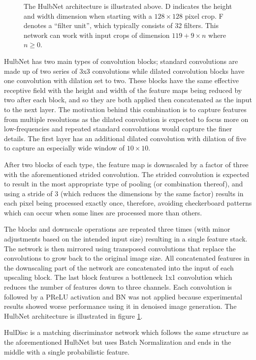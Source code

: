 
\begin{figure}
  \begin{center}
    \scalebox{0.5}{}
    \caption[HulbNet architecture]{The HulbNet architecture is illustrated above. D indicates the height and width dimension when starting with a $128\times 128$ pixel crop. F denotes a ``filter unit'', which typically consists of 32 filters. This network can work with input crops of dimension $119+9\times n$ where $n \ge 0$.}
    \label{fig:Hulb128Net}
  \end{center}
\end{figure}

HulbNet has two main types of convolution blocks; standard convolutions are made up of two series of 3x3 convolutions while dilated convolution blocks have one convolution with dilation set to two. These blocks have the same effective receptive field with the height and width of the feature maps being reduced by two after each block, and so they are both applied then concatenated as the input to the next layer. The motivation behind this combination is to capture features from multiple resolutions as the dilated convolution is expected to focus more on low-frequencies and repeated standard convolutions would capture the finer details. The first layer has an additional dilated convolution with dilation of five to capture an especially wide window of $10\times 10$.

After two blocks of each type, the feature map is downscaled by a factor of three with the aforementioned strided convolution. The strided convolution is expected to result in the most appropriate type of pooling (or combination thereof), and using a stride of 3 (which reduces the dimensions by the same factor) results in each pixel being processed exactly once, therefore, avoiding checkerboard patterns which can occur when some lines are processed more than others.

The blocks and downscale operations are repeated three times (with minor adjustments based on the intended input size) resulting in a single feature stack. The network is then mirrored using transposed convolutions that replace the convolutions to grow back to the original image size. All concatenated features in the downscaling part of the network are concatenated into the input of each upscaling block. The last block features a bottleneck 1x1 convolution which reduces the number of features down to three channels.
Each convolution is followed by a \ac{PReLU} activation and \acl{BN} was not applied because experimental results showed worse performance using it in denoised image generation. The HulbNet architecture is illustrated in figure \ref{fig:Hulb128Net}. 

HulDisc is a matching discriminator network which follows the same structure as the aforementioned HulbNet but uses Batch Normalization and ends in the middle with a single probabilistic feature. %
